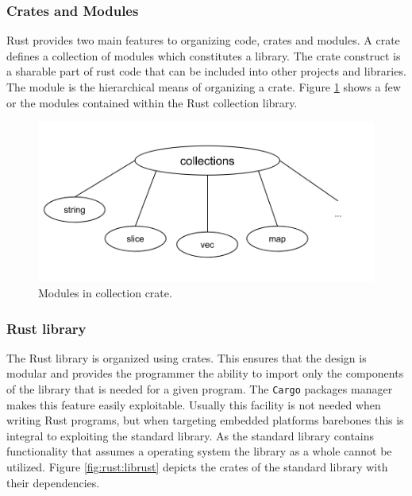 \subsubsection{Crates and Modules}

Rust provides two main features to organizing code, crates and modules.
A crate defines a collection of modules which constitutes a library.
The crate construct is a sharable part of rust code that can be included into other projects and libraries.
The module is the hierarchical means of organizing a crate.
Figure \ref{fig:rust:collections} shows a few or the modules contained within the Rust collection library.

\begin{figure}[H]
  \begin{center}
    \includegraphics[scale=0.3]{figures/background/rust/libcollections.png}
  \end{center}
  \caption{Modules in collection crate.}
  \label{fig:rust:collections}
\end{figure}

\subsubsection{Rust library}

The Rust library is organized using crates.
This ensures that the design is modular and provides the programmer the ability to import only the components of the library that is needed for a given program.
The \texttt{Cargo} packages manager makes this feature easily exploitable.
Usually this facility is not needed when writing Rust programs, but when targeting embedded platforms barebones  this is integral to exploiting the standard library.
As the standard library contains functionality that assumes a operating system the library as a whole cannot be utilized.
Figure \ref{fig:rust:librust} depicts the crates of the standard library with their dependencies.


